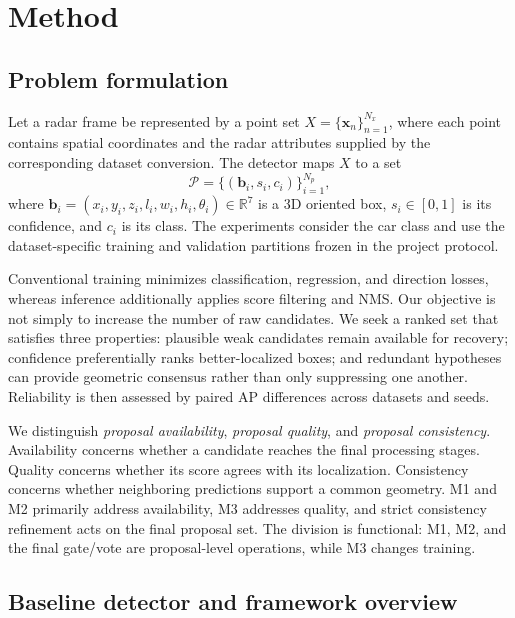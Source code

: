 \documentclass[preprint,12pt,times]{elsarticle}
\begin{document}
\section{Method}

\subsection{Problem formulation}

Let a radar frame be represented by a point set
$X=\{\mathbf{x}_n\}_{n=1}^{N_x}$, where each point contains spatial
coordinates and the radar attributes supplied by the corresponding dataset
conversion. The detector maps $X$ to a set
\begin{equation}
\mathcal{P}=\{(\mathbf{b}_i,s_i,c_i)\}_{i=1}^{N_p},
\end{equation}
where $\mathbf{b}_i=(x_i,y_i,z_i,l_i,w_i,h_i,\theta_i)\in\mathbb{R}^7$
is a 3D oriented box, $s_i\in[0,1]$ is its confidence, and $c_i$ is its
class. The experiments consider the car class and use the dataset-specific
training and validation partitions frozen in the project protocol.

Conventional training minimizes classification, regression, and direction
losses, whereas inference additionally applies score filtering and NMS. Our
objective is not simply to increase the number of raw candidates. We seek a
ranked set that satisfies three properties: plausible weak candidates remain
available for recovery; confidence preferentially ranks better-localized
boxes; and redundant hypotheses can provide geometric consensus rather than
only suppressing one another. Reliability is then assessed by paired AP
differences across datasets and seeds.

We distinguish \emph{proposal availability}, \emph{proposal quality}, and
\emph{proposal consistency}. Availability concerns whether a candidate reaches
the final processing stages. Quality concerns whether its score agrees with
its localization. Consistency concerns whether neighboring predictions support
a common geometry. M1 and M2 primarily address availability, M3 addresses
quality, and strict consistency refinement acts on the final proposal set.
The division is functional: M1, M2, and the final gate/vote are proposal-level
operations, while M3 changes training.

\subsection{Baseline detector and framework overview}
\end{document}
